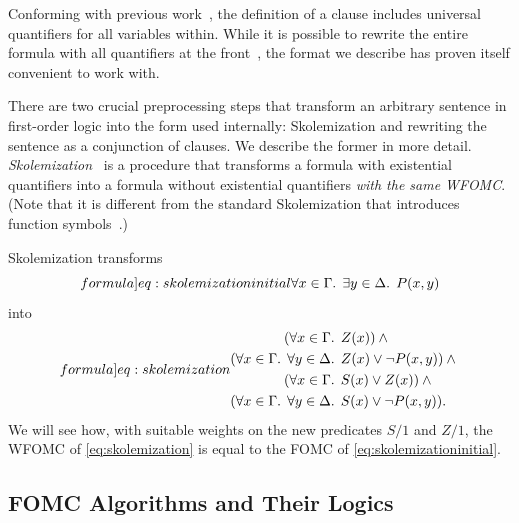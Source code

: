 \documentclass[a4paper,UKenglish,cleveref, autoref, thm-restate]{lipics-v2021}
\begin{document}
\begin{remark*}
  Conforming with previous work~\cite{DBLP:conf/ijcai/BroeckTMDR11}, the
  definition of a clause includes universal quantifiers for all variables
  within. While it is possible to rewrite the entire formula with all
  quantifiers at the front~\cite{hinman2018fundamentals}, the format we describe
  has proven itself convenient to work with.
\end{remark*}

There are two crucial preprocessing steps that transform an arbitrary sentence
in first-order logic into the form used internally: Skolemization and rewriting
the sentence as a conjunction of clauses. We describe the former in more detail.
\emph{Skolemization}~\cite{DBLP:conf/kr/BroeckMD14} is a procedure that
transforms a formula with existential quantifiers into a formula without
existential quantifiers \emph{with the same WFOMC}. (Note that it is different
from the standard Skolemization that introduces function
symbols~\cite{DBLP:books/daglib/0030198}.)

\begin{example}
  Skolemization transforms
  \begin{equation}\label[formula]{eq:skolemizationinitial}
    \forall x \in \Gamma\text{. }\exists y \in \Delta\text{. } P(x, y)
  \end{equation}
  into
  \begin{equation}\label[formula]{eq:skolemization}
    \begin{aligned}
      (\forall x \in \Gamma\text{. } &Z(x))\land{}\\
      (\forall x \in \Gamma\text{. } \forall y \in \Delta\text{. } &Z(x) \lor \neg P(x, y))\land{}\\
      (\forall x \in \Gamma\text{. } &S(x) \lor Z(x))\land{}\\
      (\forall x \in \Gamma\text{. } \forall y \in \Delta\text{. } &S(x) \lor \neg P(x, y)).
    \end{aligned}
  \end{equation}
  We will see how, with suitable weights on the new predicates $S/1$ and $Z/1$,
  the WFOMC of \cref{eq:skolemization} is equal to the FOMC of
  \cref{eq:skolemizationinitial}.
\end{example}

\subsection{FOMC Algorithms and Their Logics}\label{sec:threelogics}
\end{document}
